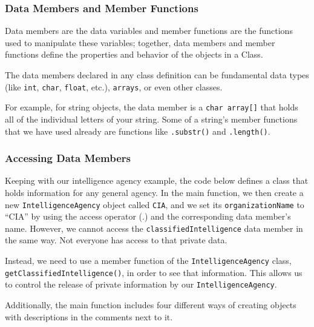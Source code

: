 \subsubsection{Data Members and Member Functions}
Data members are the data variables and member functions are the functions used to manipulate these variables; together, data members and member functions define the properties and behavior of the objects in a Class.

The data members declared in any class definition can be fundamental data types (like \texttt{int}, \texttt{char}, \texttt{float}, etc.), \texttt{arrays}, or even other classes.

For example, for string objects, the data member is a \texttt{char array[]} that holds all of the individual letters of your string. Some of a string’s member functions that we have used already are functions like \texttt{.substr()} and \texttt{.length()}.

\subsubsection{Accessing Data Members}
Keeping with our intelligence agency example, the code below defines a class that holds information for any general agency. In the main function, we then create a new \texttt{IntelligenceAgency} object called \texttt{CIA}, and we set its \texttt{organizationName} to “CIA” by using the access operator (.) and the corresponding data member’s name. However, we cannot access the \texttt{classifiedIntelligence} data member in the same way. Not everyone has access to that private data.

Instead, we need to use a member function of the \texttt{IntelligenceAgency} class, \texttt{getClassifiedIntelligence()}, in order to see that information. This allows us to control the release of private information by our \texttt{IntelligenceAgency}.

Additionally, the main function includes four different ways of creating objects with descriptions in the comments next to it.

